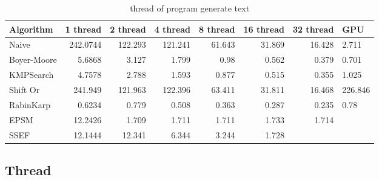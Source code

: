 \documentclass[11pt]{article}       %
\begin{document}
\begin{table}[htbp]
  \centering
  \caption{thread of program generate text}
    \begin{tabular}{lrrrrrr}\label{t6}
Algorithm & 1 thread & 2 thread & 4 thread & 8 thread & 16 thread & 32 thread & GPU \\
 \hline
    Naive & 242.0744 & 122.293 & 121.241 & 61.643 & 31.869 & 16.428 & 2.711 \\
    Boyer-Moore & 5.6868 & 3.127 & 1.799 & 0.98  & 0.562 & 0.379 & 0.701 \\
    KMPSearch & 4.7578 & 2.788 & 1.593 & 0.877 & 0.515 & 0.355 & 1.025 \\
    Shift Or & 241.949 & 121.963 & 122.396 & 63.411 & 31.811 & 16.468 & 226.846 \\
    RabinKarp & 0.6234 & 0.779 & 0.508 & 0.363 & 0.287 & 0.235 & 0.78 \\
    EPSM  & 12.2426 & 1.709 & 1.711 & 1.711 & 1.733 & 1.714 &  \\
    SSEF  & 12.1444 & 12.341 & 6.344 & 3.244 & 1.728 &       &  \\
    \end{tabular}%
  \label{tab:addlabel}%
\end{table}%

\subsection{Thread}\label{tf}
\end{document}
